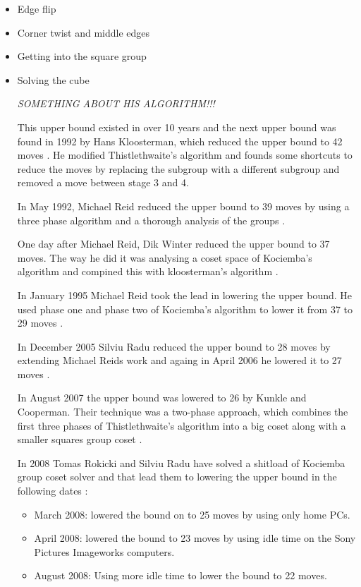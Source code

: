 \begin{itemize}
\item Edge flip
\item Corner twist and middle edges
\item Getting into the square group
\item Solving the cube


\emph{SOMETHING ABOUT HIS ALGORITHM!!!}

This upper bound existed in over 10 years and the next upper bound was found in 1992 by Hans Kloosterman, which reduced the upper bound to 42 moves \cite[p. 44]{rokickipdf}. 
He modified Thistlethwaite's algorithm and founds some shortcuts to reduce the moves by replacing the  subgroup with a different subgroup and removed a move between stage 3 and 4.

In May 1992, Michael Reid reduced the upper bound to 39 moves by using a three phase algorithm and a thorough analysis of the groups \cite[p. 52]{rokickipdf}.

One day after Michael Reid, Dik Winter reduced the upper bound to 37 moves. The way he did it was analysing a coset space of Kociemba's algorithm and compined this with kloosterman's algorithm \cite[p. 53]{rokickipdf}.

In January 1995 Michael Reid took the lead in lowering the upper bound. He used phase one and phase two of Kociemba's algorithm to lower it from 37 to 29 moves \cite[p. 55]{rokickipdf}.

In December 2005 Silviu Radu reduced the upper bound to 28 moves by extending Michael Reids work and againg in April 2006 he lowered it to 27 moves \cite[p. 58]{rokickipdf}.

In August 2007 the upper bound was lowered to 26 by Kunkle and Cooperman. Their technique was a two-phase approach, which combines the first three phases of Thistlethwaite's algorithm into a big coset along with a smaller squares group coset \cite[p. 63]{rokickipdf}.

In 2008 Tomas Rokicki and Silviu Radu have solved a shitload of Kociemba group coset solver and that lead them to lowering the upper bound in the following dates \cite[p. 66]{rokickipdf}:
\begin{itemize}
\item March 2008: lowered the bound on to 25 moves by using only home PCs.
\item April 2008: lowered the bound to 23 moves by using idle time on the Sony Pictures Imageworks computers.
\item August 2008: Using more idle time to lower the bound to 22 moves.
\end{itemize}


\end{itemize}
